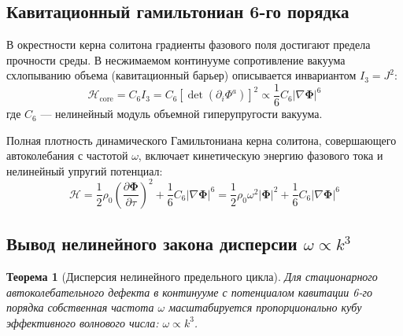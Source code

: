 \documentclass[12pt,a4paper]{article}
\newtheorem{theorem}{Теорема}
\begin{document}
	\subsection{Кавитационный гамильтониан 6-го порядка}
	В окрестности керна солитона градиенты фазового поля достигают предела прочности среды. В несжимаемом континууме сопротивление вакуума схлопыванию объема (кавитационный барьер) описывается инвариантом $I_3 = J^2$:
	\begin{equation}
		\mathcal{H}_{\text{core}} = C_6 I_3 = C_6 \left[ \det\left(\partial_i \Phi^a\right) \right]^2 \propto \frac{1}{6} C_6 |\nabla \boldsymbol{\Phi}|^6
	\end{equation}
	где $C_6$ — нелинейный модуль объемной гиперупругости вакуума.
	
	Полная плотность динамического Гамильтониана керна солитона, совершающего автоколебания с частотой $\omega$, включает кинетическую энергию фазового тока и нелинейный упругий потенциал:
	\begin{equation}
		\mathcal{H} = \frac{1}{2} \rho_0 \left( \frac{\partial \boldsymbol{\Phi}}{\partial \tau} \right)^2 + \frac{1}{6} C_6 |\nabla \boldsymbol{\Phi}|^6 = \frac{1}{2} \rho_0 \omega^2 |\boldsymbol{\Phi}|^2 + \frac{1}{6} C_6 |\nabla \boldsymbol{\Phi}|^6
	\end{equation}
	
	\subsection{Вывод нелинейного закона дисперсии $\omega \propto k^3$}
	\begin{theorem}[Дисперсия нелинейного предельного цикла]
		Для стационарного автоколебательного дефекта в континууме с потенциалом кавитации 6-го порядка собственная частота $\omega$ масштабируется пропорционально кубу эффективного волнового числа: $\omega \propto k^3$.
	\end{theorem}
	
\end{document}
